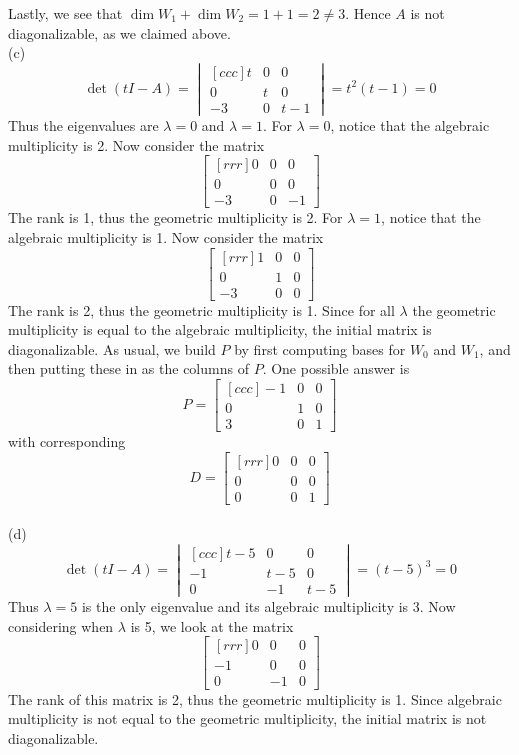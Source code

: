 \begin{solution}
Lastly, we see that $\dim W_1+\dim W_2=1+1=2\ne 3$. Hence $A$ is not diagonalizable, as we claimed above. 
\\
(c)
$$\det(t I - A) =
\begin{vmatrix}[ccc]
t &0&0\\
0&t&0\\
-3&0&t -1
\end{vmatrix}
= t^2(t -1) = 0
$$
Thus the eigenvalues are $\lambda =0$ and $\lambda = 1$. For $\lambda =0$, notice that the algebraic multiplicity is 2. Now consider the matrix
$$
\begin{bmatrix}[rrr]
0&0&0\\
0&0&0\\
-3&0&-1
\end{bmatrix}
$$
The rank is 1, thus the geometric multiplicity is  2.  For $\lambda = 1$, notice that the algebraic multiplicity is 1. Now consider the matrix
$$
\begin{bmatrix}[rrr]
1&0&0\\
0&1&0\\
-3&0&0
\end{bmatrix}
$$
The rank is 2, thus the geometric multiplicity is 1. Since for all $\lambda$ the geometric multiplicity is equal to the algebraic multiplicity, the initial matrix is diagonalizable.  As usual, we build $P$ by first computing bases for $W_0$ and $W_1$, and then putting these in as the columns of $P$. One possible answer is 
$$P =
\begin{bmatrix}[ccc]
-1&0&0\\
0&1&0\\
3&0&1
\end{bmatrix}
$$
with corresponding 
\[
D=
\begin{bmatrix}[rrr]
0&0&0\\
0&0&0\\
0&0&1
\end{bmatrix}
\]
\ \\
(d)
$$\det(t I - A) =
\begin{vmatrix}[ccc]
t - 5&0&0\\
-1&t-5&0\\
0&-1&t -5
\end{vmatrix}
= (t -5)^3 = 0
$$
Thus $\lambda = 5$ is the only eigenvalue and its algebraic multiplicity is 3. Now considering when $\lambda$ is 5, we look at the matrix
$$
\begin{bmatrix}[rrr]
0&0&0\\
-1&0&0\\
0&-1&0
\end{bmatrix}
$$
The rank of this matrix is 2, thus the geometric multiplicity is 1. Since algebraic multiplicity is not equal to the geometric multiplicity, the initial matrix is not diagonalizable.
\end{solution}
